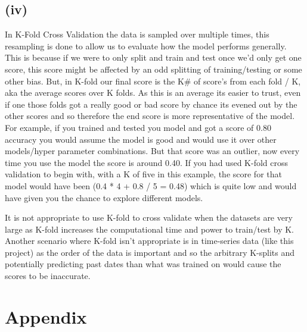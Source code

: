 \documentclass{article}
\begin{document}
\subsection{(iv)}
In K-Fold Cross Validation the data is sampled over multiple times, this resampling is done to allow us to evaluate how the model performs generally. This is because if we were to only split and train and test once we'd only get one score, this score might be affected by an odd splitting of training/testing or some other bias. But, in K-fold our final score is the K\# of score's from each fold / K, aka the average scores over K folds. As this is an average its easier to trust, even if one those folds got a really good or bad score by chance its evened out by the other scores and so therefore the end score is more representative of the model. For example, if you trained and tested you model and got a score of 0.80 accuracy you would assume the model is good and would use it over other models/hyper parameter combinations. But that score was an outlier, now every time you use the model the score is around 0.40. If you had used K-fold cross validation to begin with, with a K of five in this example, the score for that model would have been (0.4 * 4 + 0.8 / 5 = 0.48) which is quite low and would have given you the chance to explore different models.

It is not appropriate to use K-fold to cross validate when the datasets are very large as K-fold increases the computational time and power to train/test by K. Another scenario where K-fold isn't appropriate is in time-series data (like this project) as the order of the data is important and so the arbitrary K-splits and potentially predicting past dates than what was trained on would cause the scores to be inaccurate. 

\section{Appendix}


\end{document}
